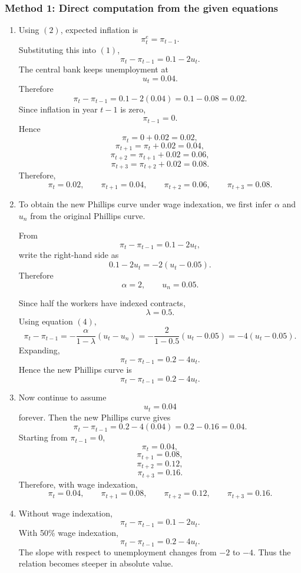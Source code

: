 \documentclass[12pt]{article}
\begin{document}
\subsubsection{Method 1: Direct computation from the given equations}
\begin{enumerate}[label=(\alph*)]
    \item
    Using \((2)\), expected inflation is
    \[
    \pi_t^e=\pi_{t-1}.
    \]
    Substituting this into \((1)\),
    \[
    \pi_t-\pi_{t-1}=0.1-2u_t.
    \]
    The central bank keeps unemployment at
    \[
    u_t=0.04.
    \]
    Therefore
    \[
    \pi_t-\pi_{t-1}=0.1-2(0.04)=0.1-0.08=0.02.
    \]
    Since inflation in year \(t-1\) is zero,
    \[
    \pi_{t-1}=0.
    \]
    Hence
    \[
    \pi_t=0+0.02=0.02,
    \]
    \[
    \pi_{t+1}=\pi_t+0.02=0.04,
    \]
    \[
    \pi_{t+2}=\pi_{t+1}+0.02=0.06,
    \]
    \[
    \pi_{t+3}=\pi_{t+2}+0.02=0.08.
    \]
    Therefore,
    \[
    \boxed{\pi_t=0.02,\qquad \pi_{t+1}=0.04,\qquad \pi_{t+2}=0.06,\qquad \pi_{t+3}=0.08.}
    \]

    \item
    To obtain the new Phillips curve under wage indexation, we first infer \(\alpha\) and \(u_n\) from the original Phillips curve.

    From
    \[
    \pi_t-\pi_{t-1}=0.1-2u_t,
    \]
    write the right-hand side as
    \[
    0.1-2u_t=-2(u_t-0.05).
    \]
    Therefore
    \[
    \alpha=2,
    \qquad
    u_n=0.05.
    \]

    Since half the workers have indexed contracts,
    \[
    \lambda=0.5.
    \]
    Using equation \((4)\),
    \[
    \pi_t-\pi_{t-1}
    =
    -\frac{\alpha}{1-\lambda}(u_t-u_n)
    =
    -\frac{2}{1-0.5}(u_t-0.05)
    =
    -4(u_t-0.05).
    \]
    Expanding,
    \[
    \pi_t-\pi_{t-1}=0.2-4u_t.
    \]
    Hence the new Phillips curve is
    \[
    \boxed{\pi_t-\pi_{t-1}=0.2-4u_t.}
    \]

    \item
    Now continue to assume
    \[
    u_t=0.04
    \]
    forever. Then the new Phillips curve gives
    \[
    \pi_t-\pi_{t-1}=0.2-4(0.04)=0.2-0.16=0.04.
    \]
    Starting from \(\pi_{t-1}=0\),
    \[
    \pi_t=0.04,
    \]
    \[
    \pi_{t+1}=0.08,
    \]
    \[
    \pi_{t+2}=0.12,
    \]
    \[
    \pi_{t+3}=0.16.
    \]
    Therefore, with wage indexation,
    \[
    \boxed{\pi_t=0.04,\qquad \pi_{t+1}=0.08,\qquad \pi_{t+2}=0.12,\qquad \pi_{t+3}=0.16.}
    \]

    \item
    Without wage indexation,
    \[
    \pi_t-\pi_{t-1}=0.1-2u_t.
    \]
    With 50\% wage indexation,
    \[
    \pi_t-\pi_{t-1}=0.2-4u_t.
    \]
    The slope with respect to unemployment changes from \(-2\) to \(-4\). Thus the relation becomes steeper in absolute value.


\end{enumerate}
\end{document}
